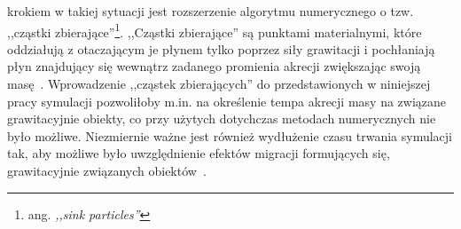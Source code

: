 krokiem w takiej sytuacji jest rozszerzenie algorytmu numerycznego o tzw.
,,cząstki zbierające''\footnote{ang. \emph{,,sink particles''}}. ,,Cząstki
zbierające'' są punktami materialnymi, które oddziałują z otaczającym je
płynem tylko poprzez siły grawitacji i pochłaniają płyn znajdujący się wewnątrz
zadanego promienia akrecji zwiększając swoją masę~\cite{FBCK10}. Wprowadzenie
,,cząstek zbierających'' do przedstawionych w niniejszej pracy symulacji
pozwoliłoby m.in. na określenie tempa akrecji masy na związane grawitacyjnie
obiekty, co przy użytych dotychczas metodach numerycznych nie było możliwe.
Niezmiernie ważne jest również wydłużenie czasu trwania symulacji tak, aby
możliwe było uwzględnienie efektów migracji formujących się, grawitacyjnie
związanych obiektów~\cite{ML14}.



